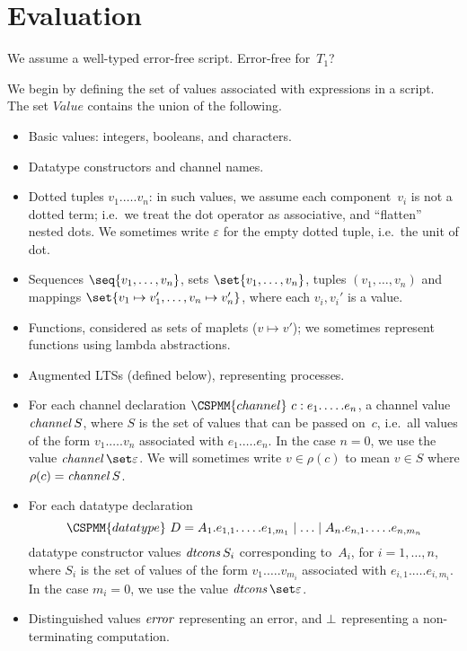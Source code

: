 \section{Evaluation}

We assume a well-typed error-free script.  \framebox{**} Error-free for~$T_1$? 


We begin by defining the set of values associated with expressions in a
script.  The set $Value$ contains the union of the following. 
%
\begin{itemize}
\item Basic values: integers, booleans, and characters.

\item Datatype constructors and channel names.

\item Dotted tuples $v_1.\ldots.v_n$: in such values, we assume each
  component~$v_i$ is not a dotted term; i.e.~we treat the dot operator as
  associative, and ``flatten'' nested dots.  We sometimes write $\varepsilon$
  for the empty dotted tuple, i.e.~the unit of dot.

\item Sequences $\seq{v_1,\ldots,v_n}$, sets
  $\set{v_1,\ldots,v_n}$, tuples $(v_1,\ldots,v_n)$ and mappings
  $\set{v_1 \mapsto v_1', \ldots, v_n \mapsto v_n'}$, where each $v_i, v_i'$
  is a value.

\item Functions, considered as sets of maplets ($v \mapsto v'$); we sometimes
  represent functions using lambda abstractions.

\item Augmented LTSs (defined below), representing processes.

\item For each channel declaration $\CSPMM{channel}~c : e_1.\ldots.e_n$, a
  channel value $\mathop{\it channel} S$, where $S$ is the set of values that can be
  passed on~$c$, i.e.~all values of the form $v_1.\ldots.v_n$ associated with
  $e_1.\ldots.e_n$.  In the case $n=0$, we use the value
  $\channel \set\varepsilon$.  We will sometimes write $v \in \rho(c)$ to mean
  $v \in S$ where $\rho(c) = \mathop{\it channel} S$.  

\item For each datatype declaration
\[
\CSPMM{datatype}~D = 
  A_1.e_{1,1}.\ldots.e_{1,m_1} \mid \ldots \mid A_n.e_{n,1}.\ldots.e_{n,m_n}
\]
datatype constructor values $\mathop{\it dtcons} S_i$ corresponding to~$A_i$, for
$i = 1,\ldots,n$, where $S_i$ is the set of values of the form
$v_1.\ldots.v_{m_i}$ associated with $e_{i,1}.\ldots.e_{i,m_i}$.  In the case
$m_i=0$, we use the value $\dtcons\set\varepsilon$.

\item Distinguished values $\mathord{\it error}$ representing an error, and $\perp$
  representing a non-terminating computation.
\end{itemize}

